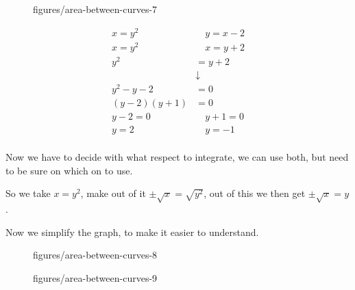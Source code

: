 \documentclass{book}
\begin{document}

\begin{figure}[ht]
    \centering
    \caption{figures/area-between-curves-7}
    \label{fig:area-between-curves-7}
\end{figure}

\begin{align*}
    x=y^2 \quad & \quad y=x-2\\
    x=y^2 \quad & \quad x=y+2\\
    y^2&= y+2 \\
       &\downarrow \\
    y^2-y-2&= 0 \\
    (y-2)(y+1)&= 0 \\
    y-2=0 \quad & \quad y+1=0 \\
    y=2 \quad & \quad y=-1 \\
\end{align*}

Now we have to decide with what respect to integrate, we can use both, but need
to be sure on which on to use.

So we take $x=y^2$, make out of it $\pm \sqrt{x} = \sqrt{y^2} $, out of this we then get $\pm \sqrt{x}=y$.




Now we simplify the graph, to make it easier to understand.

\begin{figure}[ht]
    \centering
    \caption{figures/area-between-curves-8}
    \label{fig:area-between-curves-8}
\end{figure}


\begin{figure}[ht]
    \centering
    \caption{figures/area-between-curves-9}
    \label{fig:area-between-curves-9}
\end{figure}
\end{document}
